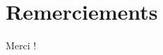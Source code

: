 \documentclass[../main.tex]{subfiles}
\begin{document}
\maketitle




\cleardoublepage
\begin{abstractpage}

\end{abstractpage}

% 

\cleardoublepage

\section*{Remerciements}

Merci !
\end{document}
